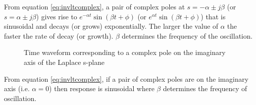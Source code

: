 \documentclass[11pt]{article} %
\theoremstyle{definition}
\begin{document}
	From equation \ref{eq:invltcomplex}, a pair of complex poles at $s=-\alpha \pm j\beta$ (or $s=\alpha \pm j\beta$) gives rise to $e^{-\alpha t}\sin{(\beta t+\phi)}$ (or $e^{\alpha t}\sin{(\beta t+\phi)}$) that is sinusoidal and decays (or grows) exponentially. The larger the value of $\alpha$ the faster the rate of decay (or growth). $\beta$ determines the frequency of the oscillation.

	\begin{figure}[H]
		\centering
		\caption{Time waveform corresponding to a complex pole on the imaginary axis of the Laplace s-plane}
	\end{figure}
	From equation \ref{eq:invltcomplex}, if a pair of complex poles are on the imaginary axis (i.e. $\alpha=0$) then response is sinusoidal where $\beta$ determines the frequency of oscillation.
\end{document}
